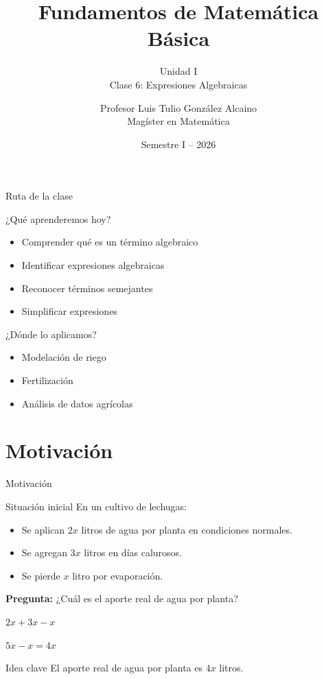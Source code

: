 \documentclass[handout,aspectratio=169,12pt]{beamer}
\title[Fundamentos de Matemática Básica]{Fundamentos de Matemática Básica}
\subtitle{Unidad I \\ Clase 6: Expresiones Algebraicas}
\author{Profesor Luis Tulio González Alcaino \\ \small Magíster en Matemática}
\institute{Universidad Santo Tomás \\ Departamento Ciencias Básicas -- Talca}
\date{Semestre I -- 2026}
\newcommand{\IdeaClave}[1]{
	\begin{alertblock}{Idea clave}
		#1
	\end{alertblock}
}
\begin{document}
	
	\begin{frame}
		\titlepage
	\end{frame}
	
\begin{frame}{Ruta de la clase}
	
	\begin{block}{¿Qué aprenderemos hoy?}
		\begin{itemize}[<+->]
			\item Comprender qué es un término algebraico
			\item Identificar expresiones algebraicas
			\item Reconocer términos semejantes
			\item Simplificar expresiones
		\end{itemize}
	\end{block}
	
	\pause
	
	\begin{exampleblock}{¿Dónde lo aplicamos?}
		\begin{itemize}[<+->]
			\item Modelación de riego
			\item Fertilización
			\item Análisis de datos agrícolas
		\end{itemize}
	\end{exampleblock}
	
\end{frame}

	\section{Motivación}
	\begin{frame}{Motivación}
		\begin{block}{Situación inicial}
			En un cultivo de lechugas:
			\begin{itemize}
				\item Se aplican \(2x\) litros de agua por planta en condiciones normales.
				\pause
				\item Se agregan \(3x\) litros en días calurosos.
				\pause
				\item Se pierde \(x\) litro por evaporación.
			\end{itemize}
		\end{block}
		
		\pause
		\textbf{Pregunta:} ¿Cuál es el aporte real de agua por planta?
		
		\pause
		$
		2x+3x-x
		$
		
		\pause
		$
		5x-x=4x
		$
		
		\pause
		\IdeaClave{El aporte real de agua por planta es \(4x\) litros.}
	\end{frame}
	
\end{document}
